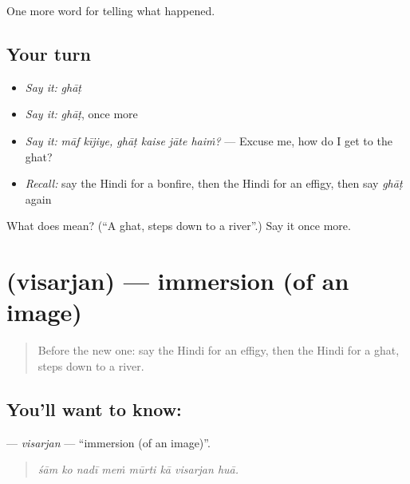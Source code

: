 \begin{grammarlens}[title={What you've built}]
One more word for telling what happened.
\end{grammarlens}

\subsection*{Your turn}
\begin{itemize}
\raggedright
  \item \emph{Say it:} \emph{ghāṭ}
  \item \emph{Say it:} \emph{ghāṭ}, once more
  \item \emph{Say it:} \emph{māf kījiye, ghāṭ kaise jāte haiṁ?} — Excuse me, how do I get to the ghat?
  \item \emph{Recall:} say the Hindi for a bonfire, then the Hindi for an effigy, then say \emph{ghāṭ} again
\end{itemize}

\begin{tcolorbox}[breakable,colback=teal!4,colframe=teal!35!black,title={Before you move on}]
What does  mean? (\textquotedblleft{}A ghat, steps down to a river\textquotedblright{}.) Say it once more.
\end{tcolorbox}
\section[\texorpdfstring{\hi{विसर्जन} (visarjan)}{विसर्जन (visarjan)}]{ (visarjan) — immersion (of an image)}

\label{lesson:HI-C333-visarjan}



\begin{quote}
Before the new one: say the Hindi for an effigy, then the Hindi for a ghat, steps down to a river.
\end{quote}

\subsection*{You'll want to know: }
\textbf{} — \emph{visarjan} — \textquotedblleft{}immersion (of an image)\textquotedblright{}.

\begin{quote}
       
\end{quote}

\begin{quote}
\emph{śām ko nadī meṁ mūrti kā visarjan huā.}
\end{quote}

